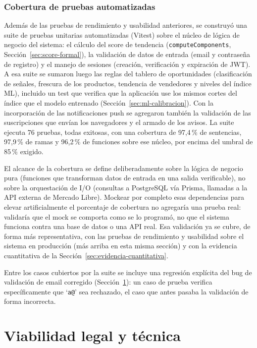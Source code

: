 \subsubsection{Cobertura de pruebas automatizadas}\label{sec:cobertura-tests}

Además de las pruebas de rendimiento y usabilidad anteriores, se construyó una suite de pruebas unitarias automatizadas (Vitest) sobre el núcleo de lógica de negocio del sistema: el cálculo del score de tendencia (\texttt{computeComponents}, Sección~\ref{sec:score-formal}), la validación de datos de entrada (email y contraseña de registro) y el manejo de sesiones (creación, verificación y expiración de JWT). A esa suite se sumaron luego las reglas del tablero de oportunidades (clasificación de señales, frescura de los productos, tendencia de vendedores y niveles del índice ML), incluido un test que verifica que la aplicación use los mismos cortes del índice que el modelo entrenado (Sección~\ref{sec:ml-calibracion}). Con la incorporación de las notificaciones push se agregaron también la validación de las suscripciones que envían los navegadores y el armado de los avisos. La suite ejecuta 76 pruebas, todas exitosas, con una cobertura de 97,4\,\% de sentencias, 97,9\,\% de ramas y 96,2\,\% de funciones sobre ese núcleo, por encima del umbral de 85\,\% exigido.

El alcance de la cobertura se define deliberadamente sobre la lógica de negocio pura (funciones que transforman datos de entrada en una salida verificable), no sobre la orquestación de I/O (consultas a PostgreSQL vía Prisma, llamadas a la API externa de Mercado Libre). Mockear por completo esas dependencias para elevar artificialmente el porcentaje de cobertura no agregaría una prueba real: validaría que el mock se comporta como se lo programó, no que el sistema funciona contra una base de datos o una API real. Esa validación ya se cubre, de forma más representativa, con las pruebas de rendimiento y usabilidad sobre el sistema en producción (más arriba en esta misma sección) y con la evidencia cuantitativa de la Sección~\ref{sec:evidencia-cuantitativa}.

Entre los casos cubiertos por la suite se incluye una regresión explícita del bug de validación de email corregido (Sección~\ref{sec:viabilidad-legal}): un caso de prueba verifica específicamente que `\texttt{a@}' sea rechazado, el caso que antes pasaba la validación de forma incorrecta.

\section{Viabilidad legal y técnica}\label{sec:viabilidad-legal}

